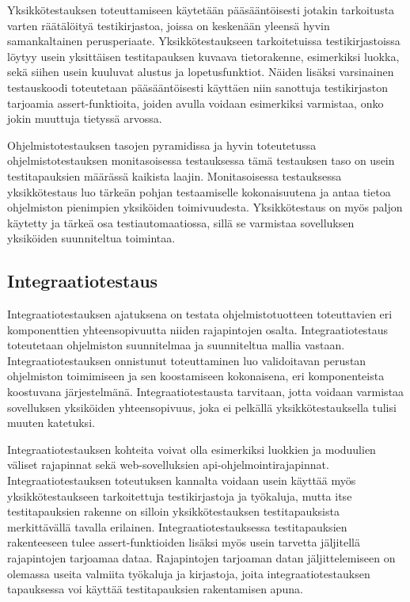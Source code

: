     Yksikkötestauksen toteuttamiseen käytetään pääsääntöisesti jotakin tarkoitusta varten räätälöityä testikirjastoa, joissa on keskenään yleensä hyvin samankaltainen perusperiaate.
    Yksikkötestaukseen tarkoitetuissa testikirjastoissa löytyy usein yksittäisen testitapauksen kuvaava tietorakenne, esimerkiksi luokka, sekä siihen usein kuuluvat alustus ja lopetusfunktiot.
    Näiden lisäksi varsinainen testauskoodi toteutetaan pääsääntöisesti käyttäen niin sanottuja testikirjaston tarjoamia assert-funktioita, joiden avulla voidaan esimerkiksi varmistaa, onko jokin muuttuja tietyssä arvossa.

    Ohjelmistotestauksen tasojen pyramidissa ja hyvin toteutetussa ohjelmistotestauksen monitasoisessa testauksessa tämä testauksen taso on usein testitapauksien määrässä kaikista laajin.
    Monitasoisessa testauksessa yksikkötestaus luo tärkeän pohjan testaamiselle kokonaisuutena ja antaa tietoa ohjelmiston pienimpien yksiköiden toimivuudesta.
    Yksikkötestaus on myös paljon käytetty ja tärkeä osa testiautomaatiossa, sillä se varmistaa sovelluksen yksiköiden suunniteltua toimintaa.

  \subsection{Integraatiotestaus} \label{ch:07_integraatiotestaus}

    Integraatiotestauksen ajatuksena on testata ohjelmistotuotteen toteuttavien eri komponenttien yhteensopivuutta niiden rajapintojen osalta.
    Integraatiotestaus toteutetaan ohjelmiston suunnitelmaa ja suunniteltua mallia vastaan.
    Integraatiotestauksen onnistunut toteuttaminen luo validoitavan perustan ohjelmiston toimimiseen ja sen koostamiseen kokonaisena, eri komponenteista koostuvana järjestelmänä.
    Integraatiotestausta tarvitaan, jotta voidaan varmistaa sovelluksen yksiköiden yhteensopivuus, joka ei pelkällä yksikkötestauksella tulisi muuten katetuksi.

    Integraatiotestauksen kohteita voivat olla esimerkiksi luokkien ja moduulien väliset rajapinnat sekä web-sovelluksien api-ohjelmointirajapinnat.
    Integraatiotestauksen toteutuksen kannalta voidaan usein käyttää myös yksikkötestaukseen tarkoitettuja testikirjastoja ja työkaluja, mutta itse testitapauksien rakenne on silloin yksikkötestauksen testitapauksista merkittävällä tavalla erilainen.
    Integraatiotestauksessa testitapauksien rakenteeseen tulee assert-funktioiden lisäksi myös usein tarvetta jäljitellä rajapintojen tarjoamaa dataa.
    Rajapintojen tarjoaman datan jäljittelemiseen on olemassa useita valmiita työkaluja ja kirjastoja, joita integraatiotestauksen tapauksessa voi käyttää testitapauksien rakentamisen apuna.

